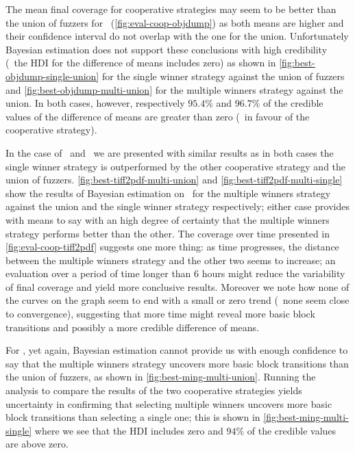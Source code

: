 The mean final coverage for cooperative strategies may seem to be better than
the union of fuzzers for \objdump\ (\autoref{fig:eval-coop-objdump}) as both
means are higher and their confidence interval do not overlap with the one for
the union. Unfortunately Bayesian estimation does not support these conclusions
with high credibility (\ie~the \ac{HDI} for the difference of means includes
zero) as shown in \autoref{fig:best-objdump-single-union} for the single winner
strategy against the union of fuzzers and \autoref{fig:best-objdump-multi-union}
for the multiple winners strategy against the union. In both cases, however,
respectively $95.4\%$ and $96.7\%$ of the credible values of the difference of
means are greater than zero (\ie~in favour of the cooperative strategy).

In the case of \tiffpdf\ and \listswf\ we are presented with similar results as
in both cases the single winner strategy is outperformed by the other
cooperative strategy and the union of fuzzers.
\autoref{fig:best-tiff2pdf-multi-union} and
\autoref{fig:best-tiff2pdf-multi-single} show the results of Bayesian estimation
on \tiffpdf\ for the multiple winners strategy against the union and the single
winner strategy respectively; either case provides with means to say with an
high degree of certainty that the multiple winners strategy performs better than
the other. The coverage over time presented in \autoref{fig:eval-coop-tiff2pdf}
suggests one more thing: as time progresses, the distance between the multiple
winners strategy and the other two seems to increase; an evaluation over a
period of time longer than $6$ hours might reduce the variability of final
coverage and yield more conclusive results. Moreover we note how none of the
curves on the graph seem to end with a small or zero trend (\ie~none seem close
to convergence), suggesting that more time might reveal more basic block
transitions and possibly a more credible difference of means.

For \listswf, yet again, Bayesian estimation cannot provide us with enough
confidence to say that the multiple winners strategy uncovers more basic block
transitions than the union of fuzzers, as shown in
\autoref{fig:best-ming-multi-union}. Running the analysis to compare the results
of the two cooperative strategies yields uncertainty in confirming that
selecting multiple winners uncovers more basic block transitions than selecting
a single one; this is shown in \autoref{fig:best-ming-multi-single} where we see
that the \ac{HDI} includes zero and $94\%$ of the credible values are above
zero.

